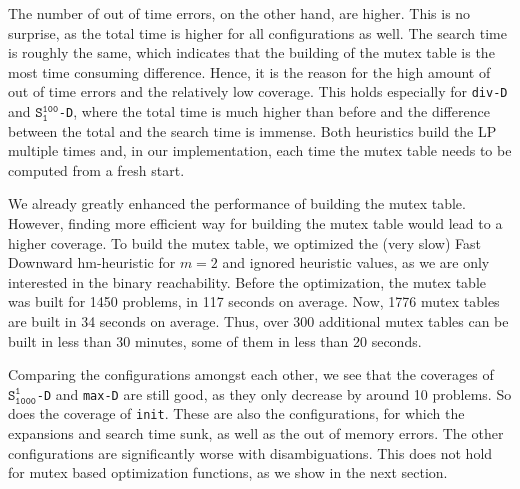 
The number of out of time errors, on the other hand, are higher.
This is no surprise, as the total time is higher for all configurations as well.
The search time is roughly the same, which indicates that the building of the mutex table is the most time consuming difference.
Hence, it is the reason for the high amount of out of time errors and the relatively low coverage.
This holds especially for \texttt{div-D} and $\texttt{S}_\texttt{1}^\texttt{100}$\texttt{-D}, where the total time is much higher than before and the difference between the total and the search time is immense.
Both heuristics build the LP multiple times and, in our implementation, each time the mutex table needs to be computed from a fresh start.

We already greatly enhanced the performance of building the mutex table.
However, finding more efficient way for building the mutex table would lead to a higher coverage.
To build the mutex table, we optimized the (very slow) Fast Downward hm-heuristic for $m=2$ and ignored heuristic values, as we are only interested in the binary reachability.
Before the optimization, the mutex table was built for 1450 problems, in 117 seconds on average.
Now, 1776 mutex tables are built in 34 seconds on average.
Thus, over 300 additional mutex tables can be built in less than 30 minutes, some of them in less than 20 seconds.

Comparing the configurations amongst each other, we see that the coverages of $\texttt{S}_\texttt{1000}^\texttt{1}$\texttt{-D} and \texttt{max-D} are still good, as they only decrease by around 10 problems.
So does the coverage of \texttt{init}.
These are also the configurations, for which the expansions and search time sunk, as well as the out of memory errors.
The other configurations are significantly worse with disambiguations.
This does not hold for mutex based optimization functions, as we show in the next section.

